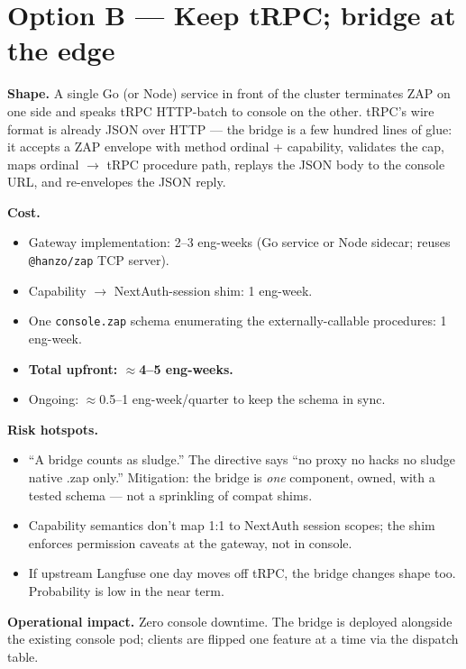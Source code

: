 \documentclass[11pt,letterpaper]{article}
\begin{document}
\section{Option B --- Keep tRPC; bridge at the edge}
\textbf{Shape.} A single Go (or Node) service in front of the cluster terminates ZAP on one side and speaks tRPC HTTP-batch to console on the other. tRPC's wire format is already JSON over HTTP --- the bridge is a few hundred lines of glue: it accepts a ZAP envelope with method ordinal + capability, validates the cap, maps ordinal $\rightarrow$ tRPC procedure path, replays the JSON body to the console URL, and re-envelopes the JSON reply.

\textbf{Cost.}
\begin{itemize}[leftmargin=1.2em,itemsep=2pt]
  \item Gateway implementation: 2--3 eng-weeks (Go service or Node sidecar; reuses \texttt{@hanzo/zap} TCP server).
  \item Capability $\rightarrow$ NextAuth-session shim: 1 eng-week.
  \item One \texttt{console.zap} schema enumerating the externally-callable procedures: 1 eng-week.
  \item \textbf{Total upfront: $\approx$4--5 eng-weeks.}
  \item Ongoing: $\approx$0.5--1 eng-week/quarter to keep the schema in sync.
\end{itemize}

\textbf{Risk hotspots.}
\begin{itemize}[leftmargin=1.2em,itemsep=2pt]
  \item ``A bridge counts as sludge.'' The directive says ``no proxy no hacks no sludge native .zap only.'' Mitigation: the bridge is \emph{one} component, owned, with a tested schema --- not a sprinkling of compat shims.
  \item Capability semantics don't map 1:1 to NextAuth session scopes; the shim enforces permission caveats at the gateway, not in console.
  \item If upstream Langfuse one day moves off tRPC, the bridge changes shape too. Probability is low in the near term.
\end{itemize}

\textbf{Operational impact.} Zero console downtime. The bridge is deployed alongside the existing console pod; clients are flipped one feature at a time via the dispatch table.
\end{document}
